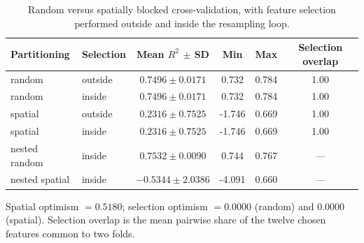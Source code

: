 \begin{table}[htbp]
\centering
\caption{Random versus spatially blocked cross-validation, with feature selection performed outside and inside the resampling loop.}\label{tab:validation}
\small
\begin{tabular}{llcccc}
\toprule
Partitioning & Selection & Mean $R^2$ $\pm$ SD & Min & Max & Selection overlap \\
\midrule
random & outside & $0.7496 \pm 0.0171$ & 0.732 & 0.784 & 1.00 \\
random & inside & $0.7496 \pm 0.0171$ & 0.732 & 0.784 & 1.00 \\
spatial & outside & $0.2316 \pm 0.7525$ & -1.746 & 0.669 & 1.00 \\
spatial & inside & $0.2316 \pm 0.7525$ & -1.746 & 0.669 & 1.00 \\
nested random & inside & $0.7532 \pm 0.0090$ & 0.744 & 0.767 & --- \\
nested spatial & inside & $-0.5344 \pm 2.0386$ & -4.091 & 0.660 & --- \\
\bottomrule
\end{tabular}
\begin{flushleft}\footnotesize Spatial optimism $= 0.5180$; selection optimism $= 0.0000$ (random) and $0.0000$ (spatial). Selection overlap is the mean pairwise share of the twelve chosen features common to two folds.\end{flushleft}
\end{table}
